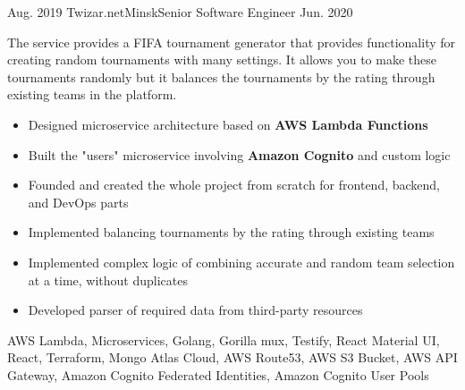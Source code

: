 \begin{experiences}
  \experience
    {Aug. 2019} {Twizar.net}{Minsk}{Senior Software Engineer}
    {Jun. 2020}
    {
      The service provides a FIFA tournament generator that provides functionality for creating random tournaments
      with many settings. It allows you to make these tournaments randomly but it balances the tournaments by the rating
      through existing teams in the platform.
      \begin{itemize}
        \item {Designed microservice architecture based on \textbf{AWS Lambda Functions}}
        \item {Built the "users" microservice involving \textbf{Amazon Cognito} and custom logic}
        \item {Founded and created the whole project from scratch for frontend, backend, and DevOps parts}
        \item {Implemented balancing tournaments by the rating through existing teams}
        \item {Implemented complex logic of combining accurate and random team selection at
        a time, without duplicates}
        \item {Developed parser of required data from third-party resources}
      \end{itemize}
    }
    {
      AWS Lambda, Microservices, Golang, Gorilla mux, Testify, React Material UI, React, Terraform, Mongo Atlas Cloud,
      AWS Route53, AWS S3 Bucket, AWS API Gateway, Amazon Cognito Federated Identities, Amazon Cognito User Pools
    }
  \emptySeparator


\end{experiences}
